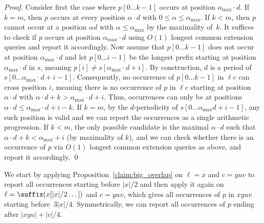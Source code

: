 \begin{proof}
Consider first the case where $p[0 \dots k-1]$ occurs at position $\alpha_{\max} \cdot d$. If $k=m$, then $p$ occurs at every position $\alpha \cdot d$ with $0 \leq \alpha \leq \alpha_{\max}$. If $k<m$, then $p$ cannot occur at a position $\alpha d$ with $\alpha \leq \alpha_{\max}$ by the maximality of~$k$.
It suffices to check if $p$ occurs at position $\alpha_{max} \cdot d$ using $O(1)$ longest common extension queries and report it accordingly. Now assume that $p[0 \dots k-1]$ does not occur at position $\alpha_{\max}\cdot  d$ and let $p[0 \dots i-1]$ be the longest prefix starting at position $\alpha_{\max} \cdot d$ in $s$, meaning $p[i] \neq s[\alpha_{\max} \cdot d +i]$.
By construction, $d$ is a period of $s[0 \dots \alpha_{\max} \cdot d + i-1]$. Consequently, no occurrence of $p[0 \dots k-1]$ in $\ell c$ can cross position $i$, meaning there is no occurrence of $p$ in $\ell c$ starting at position $\alpha \cdot d$ with $\alpha \cdot d + k > \alpha_{\max} \cdot d + i$. Thus, occurrences can only be at positions $\alpha \cdot d \leq \alpha_{\max} \cdot d +i-k$. If $k=m$, by the $d$-periodicity of $s[0 \dots \alpha_{\max} d + i-1]$, any such position is valid and we can report the occurrences as a single arithmetic progression.
If $k<m$, the only possible candidate is the maximal $\alpha \cdot d$ such that $\alpha \cdot d +k < \alpha_{\max} +i $ (by maximality of $k$), and we can check whether there is an occurrence of $p$ via $O(1)$ longest common extension queries as above, and report it accordingly.
\qed
\end{proof}

We start by applying Proposition~\ref{claim:big_overlap} on $\ell = x$ and $c = yuv$ to report all occurrences starting before $|x|/2$ and then apply it again on $\ell = \suffix(x[|x|/2 \dots])$ and $c = yuv$, which gives all occurrences of $p$ in $xyuv$ starting before~$3|x|/4$. Symmetrically, we can report all occurrences of $p$ ending after $|xyu| + |v|/4$. 

